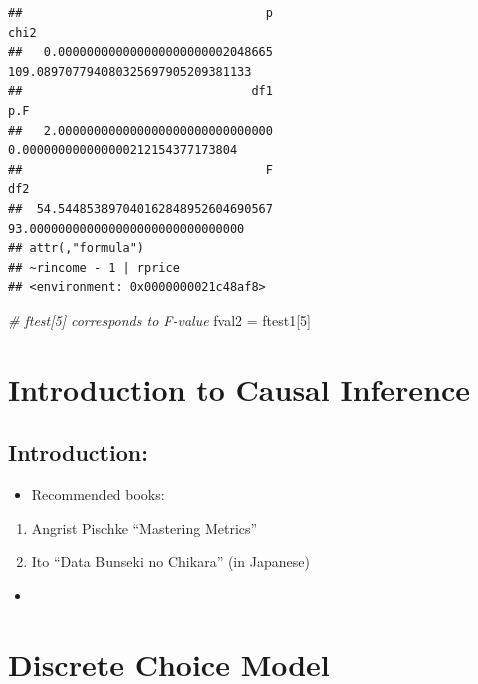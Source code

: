 \documentclass[]{book}
\newenvironment{Shaded}{\begin{snugshade}}{\end{snugshade}}
\newcommand{\DecValTok}[1]{\textcolor[rgb]{0.00,0.00,0.81}{#1}}
\newcommand{\StringTok}[1]{\textcolor[rgb]{0.31,0.60,0.02}{#1}}
\newcommand{\CommentTok}[1]{\textcolor[rgb]{0.56,0.35,0.01}{\textit{#1}}}
\newcommand{\NormalTok}[1]{#1}
\providecommand{\tightlist}{%
  \setlength{\itemsep}{0pt}\setlength{\parskip}{0pt}}
\begin{document}
\begin{verbatim}
##                                  p                               chi2 
##   0.000000000000000000000002048665 109.089707794080325697905209381133 
##                                df1                                p.F 
##   2.000000000000000000000000000000   0.000000000000000212154377173804 
##                                  F                                df2 
##  54.544853897040162848952604690567  93.000000000000000000000000000000 
## attr(,"formula")
## ~rincome - 1 | rprice
## <environment: 0x0000000021c48af8>
\end{verbatim}

\begin{Shaded}
\begin{Highlighting}[]
\CommentTok{# ftest[5] corresponds to F-value}
\NormalTok{fval2 =}\StringTok{ }\NormalTok{ftest1[}\DecValTok{5}\NormalTok{]}
\end{Highlighting}
\end{Shaded}

\chapter{Introduction to Causal
Inference}\label{introduction-to-causal-inference}

\section{Introduction:}\label{introduction-3}

\begin{itemize}
\tightlist
\item
  Recommended books:
\end{itemize}

\begin{enumerate}
\def\labelenumi{\arabic{enumi}.}
\tightlist
\item
  Angrist Pischke ``Mastering Metrics''
\item
  Ito ``Data Bunseki no Chikara'' (in Japanese)
\end{enumerate}

\begin{itemize}
\item
\end{itemize}

\chapter{Discrete Choice Model}\label{discrete-choice-model}
\end{document}
